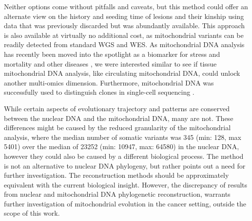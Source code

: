 Neither options come without pitfalls and caveats, but this method could offer an alternate view on the history and seeding time of lesions and their kinship using data that was previously discarded but was abundantly available. This approach is also available at virtually no additional cost, as mitochondrial variants can be readily detected from standard WGS and WES. As mitochondrial DNA analysis has recently been moved into the spotlight as a biomarker for stress and mortality \cite{Trumpff2021} and other diseases \cite{Cushen2022}, we were interested similar to see if tissue mitochondrial DNA analysis, like circulating mitochondrial DNA, could unlock another multi-omics dimension. Furthermore, mitochondrial DNA was successfully used to distinguish clones in single-cell sequencing \cite{Ludwig2019}. 

While certain aspects of evolutionary trajectory and patterns are conserved between the nuclear DNA and the mitochondrial DNA, many are not. These differences might be caused by the reduced granularity of the mitochondrial analysis, where the median number of somatic variants was 345 (min: 128, max 5401) over the median of 23252 (min: 10947, max: 64580) in the nuclear DNA, however they could also be caused by a different biological process. The method is not an alternative to nuclear DNA phylogeny, but rather points out a need for further investigation. The reconstruction methods should be approximately equivalent with the current biological insight. However, the discrepancy of results from nuclear and mitochondrial DNA phylogenetic reconstruction, warrants further investigation of mitochondrial evolution in the cancer setting, outside the scope of this work.